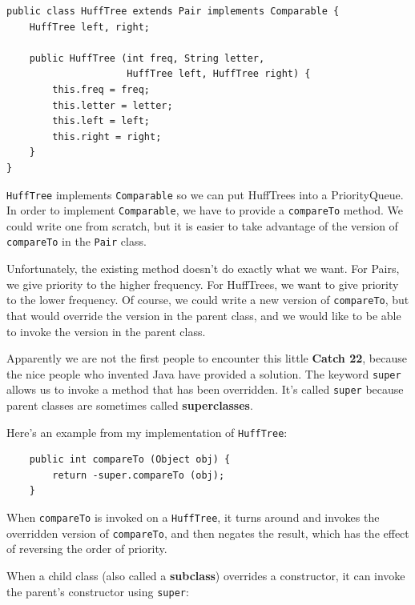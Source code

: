 \documentclass[12pt]{book}
\theoremstyle{exercise}
\begin{document}
\begin{verbatim}
public class HuffTree extends Pair implements Comparable {
    HuffTree left, right;

    public HuffTree (int freq, String letter,
                     HuffTree left, HuffTree right) {
        this.freq = freq;
        this.letter = letter;
        this.left = left;
        this.right = right;
    }
}
\end{verbatim}

{\tt HuffTree} implements {\tt Comparable} so we can put HuffTrees
into a PriorityQueue.  In order to implement {\tt Comparable}, we have to
provide a {\tt compareTo} method.  We could write one from scratch,
but it is easier to take advantage of the version of {\tt compareTo}
in the {\tt Pair} class.

Unfortunately, the existing method doesn't do exactly what we want.
For Pairs, we give priority to the higher frequency.  For HuffTrees,
we want to give priority to the lower frequency.  Of course, we could
write a new version of {\tt compareTo}, but that would override the
version in the parent class, and we would like to be able to invoke
the version in the parent class.


Apparently we are not the first people to encounter this little
{\bf Catch 22}, because the nice people who invented Java have provided
a solution.  The keyword {\tt super} allows us to invoke a method
that has been overridden.  It's called {\tt super} because parent
classes are sometimes called {\bf superclasses}.


Here's an example from my implementation of {\tt HuffTree}:

\begin{verbatim}
    public int compareTo (Object obj) {
        return -super.compareTo (obj);
    }
\end{verbatim}

When {\tt compareTo} is invoked on a {\tt HuffTree}, it turns
around and invokes the overridden version of {\tt compareTo},
and then negates the result, which has the effect of reversing
the order of priority.


When a child class (also called a {\bf subclass}) overrides
a constructor, it can invoke the parent's constructor using
{\tt super}:
\end{document}
